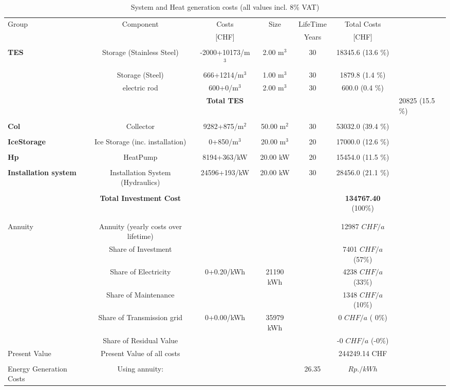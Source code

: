 \documentclass[english]{SPFShortReport}
\begin{document}
\begin{table}[!ht]
\centering
\caption{System and Heat generation costs (all values incl. 8$\%$ VAT) }
\begin{adjustbox}{max width =\textwidth}
\begin{tabular}{l | c c c c c } 
\hline
\hline
Group &Component &Costs &Size &LifeTime &Total Costs \\ 
 & &[CHF] & &Years &[CHF]\\ 
\hline
\\ 
\textbf{TES} & Storage (Stainless Steel) & -2000+10173/m$^3$ & 2.00 m$^3$ &30 & 18345.6 (13.6 \%) \\ 
 & Storage (Steel) & 666+1214/m$^3$ & 1.00 m$^3$ &30 & 1879.8 (1.4 \%) \\ 
 & electric rod & 600+0/m$^3$ & 2.00 m$^3$ &30 & 600.0 (0.4 \%) \\ 
& 
 &\textbf{Total TES} &  & & & 20825 (15.5 \%) \\ 
\hline \\ 
\textbf{Col} & Collector & 9282+875/m$^2$ & 50.00 m$^2$ &30 & 53032.0 (39.4 \%) \\ 
\hline \\ 
\textbf{IceStorage} & Ice Storage (inc. installation) & 0+850/m$^3$ & 20.00 m$^3$ &20 & 17000.0 (12.6 \%) \\ 
\hline \\ 
\textbf{Hp} & HeatPump & 8194+363/kW & 20.00 kW &20 & 15454.0 (11.5 \%) \\ 
\hline \\ 
\textbf{Installation system} & Installation System (Hydraulics) & 24596+193/kW & 20.00 kW &30 & 28456.0 (21.1 \%) \\ 
\hline \\ 
 & \textbf{Total Investment Cost} & && &\textbf{134767.40} (100\%) \\ 
\hline \\ 
\hline \\ 
Annuity & Annuity (yearly costs over lifetime)  &&& & 12987 $CHF/a$  \\ 
 & Share of Investment & &&& 7401 $CHF/a$ (57\%) \\ 
 & Share of Electricity  & 0+0.20/kWh & 21190 kWh&  & 4238 $CHF/a$ (33\%)\\ 
 & Share of Maintenance & &&& 1348 $CHF/a$ (10\%)\\ 
 & Share of Transmission grid & 0+0.00/kWh & 35979  kWh & &  0 $CHF/a$ ( 0\%)\\ 
 & Share of Residual Value &&& & -0 $CHF/a$ (-0\%)\\ 
Present Value  & Present Value of all costs  & &&& 244249.14 CHF  \\ 
\hline \\ 
 Energy Generation Costs & Using annuity: &&& 26.35 & $Rp./kWh$ \\ 
\hline
\hline
\end{tabular}
\end{adjustbox}
\label{CostsTable}
\end{table}
\end{document}
